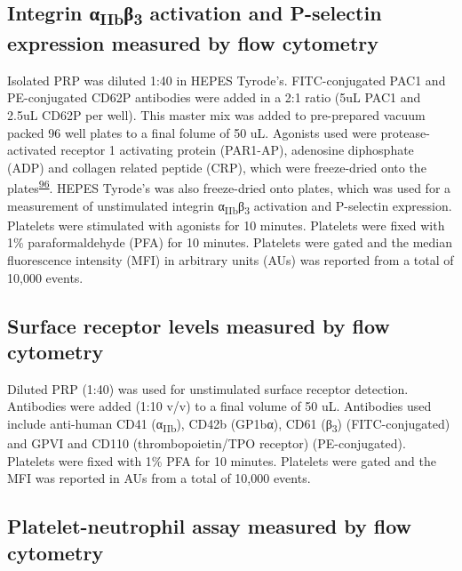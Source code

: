 \documentclass[11pt,twoside]{bristolthesis}
\begin{document}
\hypertarget{integrin-ux3b1iibux3b23-activation-and-p-selectin-expression-measured-by-flow-cytometry}{%
\subsection{\texorpdfstring{Integrin α\textsubscript{IIb}β\textsubscript{3} activation and P-selectin expression measured by flow cytometry}{Integrin αIIbβ3 activation and P-selectin expression measured by flow cytometry}}\label{integrin-ux3b1iibux3b23-activation-and-p-selectin-expression-measured-by-flow-cytometry}}

Isolated PRP was diluted 1:40 in HEPES Tyrode's. FITC-conjugated PAC1 and PE-conjugated CD62P antibodies were added in a 2:1 ratio (5uL PAC1 and 2.5uL CD62P per well). This master mix was added to pre-prepared vacuum packed 96 well plates to a final folume of 50 uL. Agonists used were protease-activated receptor 1 activating protein (PAR1-AP), adenosine diphosphate (ADP) and collagen related peptide (CRP), which were freeze-dried onto the plates\textsuperscript{\protect\hyperlink{ref-Chan2018}{96}}. HEPES Tyrode's was also freeze-dried onto plates, which was used for a measurement of unstimulated integrin α\textsubscript{IIb}β\textsubscript{3} activation and P-selectin expression. Platelets were stimulated with agonists for 10 minutes. Platelets were fixed with 1\% paraformaldehyde (PFA) for 10 minutes. Platelets were gated and the median fluorescence intensity (MFI) in arbitrary units (AUs) was reported from a total of 10,000 events.

\hypertarget{surface-receptor-levels-measured-by-flow-cytometry}{%
\subsection{Surface receptor levels measured by flow cytometry}\label{surface-receptor-levels-measured-by-flow-cytometry}}

Diluted PRP (1:40) was used for unstimulated surface receptor detection. Antibodies were added (1:10 v/v) to a final volume of 50 uL. Antibodies used include anti-human CD41 (α\textsubscript{IIb}), CD42b (GP1bα), CD61 (β\textsubscript{3}) (FITC-conjugated) and GPVI and CD110 (thrombopoietin/TPO receptor) (PE-conjugated). Platelets were fixed with 1\% PFA for 10 minutes. Platelets were gated and the MFI was reported in AUs from a total of 10,000 events.

\hypertarget{platelet-neutrophil-assay-measured-by-flow-cytometry}{%
\subsection{Platelet-neutrophil assay measured by flow cytometry}\label{platelet-neutrophil-assay-measured-by-flow-cytometry}}
\end{document}
